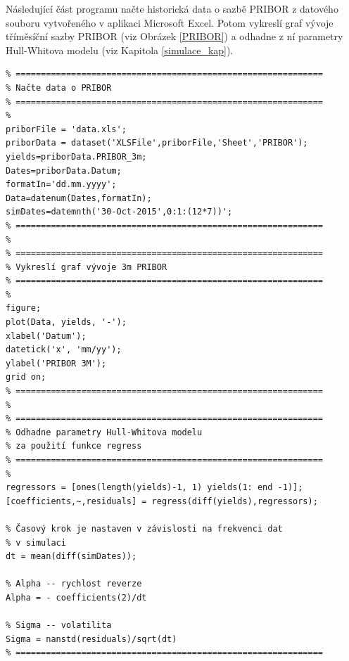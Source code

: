 \documentclass[a4paper,12pt]{report}
\theoremstyle{definition} \newtheorem{definice}[veta]{Definice}
\theoremstyle{remark}
\begin{document}
Následující část programu načte historická data o sazbě PRIBOR z datového souboru vytvořeného v aplikaci Microsoft Excel.
Potom vykreslí graf vývoje tříměsíční sazby PRIBOR (viz Obrázek \ref{PRIBOR}) a odhadne z ní parametry Hull-Whitova modelu (viz Kapitola \ref{simulace_kap}).
\begin{verbatim}
% =============================================================
% Načte data o PRIBOR
% =============================================================
%
priborFile = 'data.xls';
priborData = dataset('XLSFile',priborFile,'Sheet','PRIBOR');
yields=priborData.PRIBOR_3m;
Dates=priborData.Datum;
formatIn='dd.mm.yyyy';
Data=datenum(Dates,formatIn);
simDates=datemnth('30-Oct-2015',0:1:(12*7))';
% =============================================================
%
% =============================================================
% Vykreslí graf vývoje 3m PRIBOR
% =============================================================
%
figure;
plot(Data, yields, '-');
xlabel('Datum');
datetick('x', 'mm/yy');
ylabel('PRIBOR 3M');
grid on;
% =============================================================
%
% =============================================================
% Odhadne parametry Hull-Whitova modelu 
% za použití funkce regress
% =============================================================
%
regressors = [ones(length(yields)-1, 1) yields(1: end -1)];
[coefficients,~,residuals] = regress(diff(yields),regressors);

% Časový krok je nastaven v závislosti na frekvenci dat 
% v simulaci
dt = mean(diff(simDates));

% Alpha -- rychlost reverze
Alpha = - coefficients(2)/dt

% Sigma -- volatilita
Sigma = nanstd(residuals)/sqrt(dt)
% =============================================================
\end{verbatim}
\end{document}
